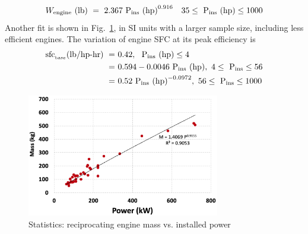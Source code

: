 \begin{equation}
\label{eqn:pistonwt}
W_{\rm engine}\textrm{ } (\textrm{lb}) \textrm{ } = \textrm{ } 2.367 \textrm{ P}_{\rm ins}\textrm{ (hp)} ^ {0.916} \quad 35 \leq \textrm{ P}_{\rm ins}\textrm{ (hp)} \leq 1000
\end{equation}
Another fit is shown in Fig.~\ref{fig:piston}, in SI units with a larger sample size, including less efficient engines. The variation of engine SFC at its peak efficiency is 
\begin{align*}
\textrm{sfc}_{_{\rm base}} (\textrm{lb/hp-hr}) \textrm{ } = &\textrm{ } 0.42, \textrm{ } \textrm{ P}_{\rm ins} \textrm{ (hp)} \leq 4 \\
=&\textrm{ } 0.594 - 0.0046 \textrm{ P}_{\rm ins} \textrm{ (hp)}, \textrm{ } 4 \leq \textrm{ P}_{\rm ins} \leq 56 \\
=&\textrm{ } 0.52 \textrm{ P}_{\rm ins} \textrm{ (hp)}^{-0.0972}, \textrm{ } 56 \leq \textrm{ P}_{\rm ins} \leq 1000
\end{align*}

\begin{figure}
\begin{center}
\includegraphics[width=0.75\textwidth]{images/piston.png}
\vspace{-0.1cm}
\caption{Statistics: reciprocating engine mass vs. installed power}
\label{fig:piston}
\end{center}
\end{figure}

